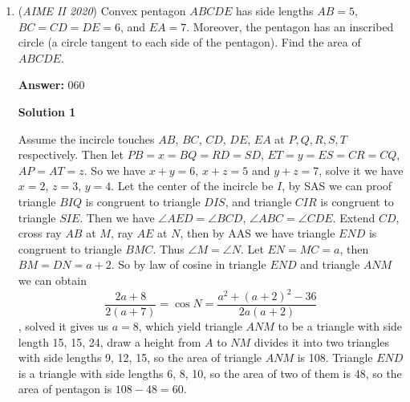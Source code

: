 \begin{enumerate}
 For each possible choice of $m$ and $n$, let $\ell_{m,n}$ denote the line through the centers of squares $200$ and $2000.$ Note that for odd values of $m$, the line $\ell_{m,n}$ passes through the center of square $1100.$ Thus $\ell_{m,n}$ intersects the interior of cell $1099$ exactly when its slope is strictly between $-1$ and $1$. The line $\ell_{m,n}$ is vertical whenever square $2000$ is the $200$th square in the bottom row of the rectangle. This would happen for $m = 3, 5, 7, 9$ when $n = 900, 450, 300, 225$, respectively. When $n$ is 1 greater than or 1 less than these numbers, the slope of $\ell_{m,n}$ is $1$ or $-1$, respectively. In all other cases the slope is strictly between $-1$ and $1.$ The admissible values for $n$ for each possible value of $m$ are given in the following table.
 \[\begin{tabular}{|c|c|c|c|c|}\hline m & minimum n & maximum n & avoided n & number of odd n\\\hline 3&667&999&899, 900, 901&165\\\hline 5&400&499&449, 450, 451&48\\\hline 7&286&333&299, 300, 301&22\\\hline 9&223&249&224, 225, 226&13\\\hline \end{tabular}\]This accounts for $165 + 48 + 22 + 13 = 248$ rectangles.

 


	\item (\textit{AIME II 2020}) Convex pentagon $ABCDE$ has side lengths $AB=5$, $BC=CD=DE=6$, and $EA=7$. Moreover, the pentagon has an inscribed circle (a circle tangent to each side of the pentagon). Find the area of $ABCDE$.


 
 \textbf{Answer: }060



\textbf{Solution 1}

Assume the incircle touches $AB$, $BC$, $CD$, $DE$, $EA$ at $P,Q,R,S,T$ respectively. Then let $PB=x=BQ=RD=SD$, $ET=y=ES=CR=CQ$, $AP=AT=z$. So we have $x+y=6$, $x+z=5$ and $y+z=7$, solve it we have $x=2$, $z=3$, $y=4$. Let the center of the incircle be $I$, by SAS we can proof triangle $BIQ$ is congruent to triangle $DIS$, and triangle $CIR$ is congruent to triangle $SIE$. Then we have $\angle AED=\angle BCD$, $\angle ABC=\angle CDE$. Extend $CD$, cross ray $AB$ at $M$, ray $AE$ at $N$, then by AAS we have triangle $END$ is congruent to triangle $BMC$. Thus $\angle M=\angle N$. Let $EN=MC=a$, then $BM=DN=a+2$. So by law of cosine in triangle $END$ and triangle $ANM$ we can obtain 
 \[\frac{2a+8}{2(a+7)}=\cos N=\frac{a^2+(a+2)^2-36}{2a(a+2)}\], solved it gives us $a=8$, which yield triangle $ANM$ to be a triangle with side length 15, 15, 24, draw a height from $A$ to $NM$ divides it into two triangles with side lengths 9, 12, 15, so the area of triangle $ANM$ is 108. Triangle $END$ is a triangle with side lengths 6, 8, 10, so the area of two of them is 48, so the area of pentagon is $108-48=\boxed{60}$.


\end{enumerate}
